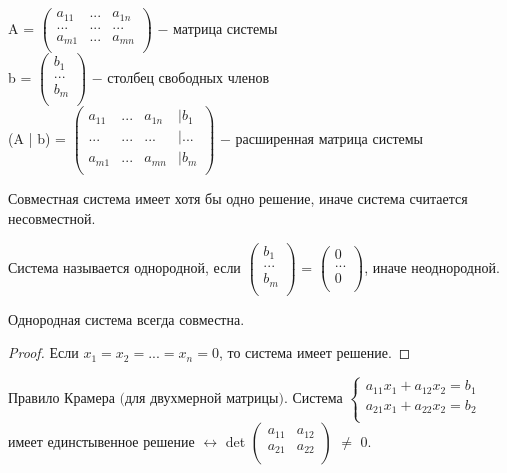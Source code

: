 	A = 
	$\begin{pmatrix}
		a_{11} & ... & a_{1n}\\
		... & ... & ...\\
		a_{m1} & ... & a_{mn}\\
	\end{pmatrix}$ $-$ матрица системы\\
	\newline
	b = 
	$\begin{pmatrix}
		b_{1}\\
		...\\
		b_{m}\\
	\end{pmatrix}$ $-$ столбец свободных членов\\
	\newline
	(A | b) = 
	$\begin{pmatrix}
		a_{11} & ... & a_{1n} & | b_1\\
		... & ... & ... & | ...\\
		a_{m1} & ... & a_{mn} & | b_{m}\\
	\end{pmatrix}$ $-$ расширенная матрица системы\\
	
	\newpage
	
	$\textit{Совместная}$ система имеет хотя бы одно решение, иначе система считается $\textit{несовместной}$.
	
	Система называется $\textit{однородной}$, если 
	$\begin{pmatrix}
		b_1\\
		...\\
		b_m\\
	\end{pmatrix}$ = 
	$\begin{pmatrix}
		0\\
		...\\
		0\\
	\end{pmatrix}$, иначе $\textit{неоднородной}$.
	
	\begin{theorem}
		Однородная система всегда совместна.
	\end{theorem}
	\begin{proof}
		Если $x_1 = x_2 = ... = x_n = 0$, то система имеет решение.
	\end{proof}
	
	$\textbf{Правило Крамера (для двухмерной матрицы)}$. Система
	$\begin{cases}
		a_{11}x_1 + a_{12}x_2 = b_1\\
		a_{21}x_1 + a_{22}x_2 = b_2\\
	\end{cases}$ имеет единстывенное решение $\longleftrightarrow$ det
	$\begin{pmatrix}
		a_{11} & a_{12}\\
		a_{21} & a_{22}\\
	\end{pmatrix}$ $\ne$ 0.\\
	
